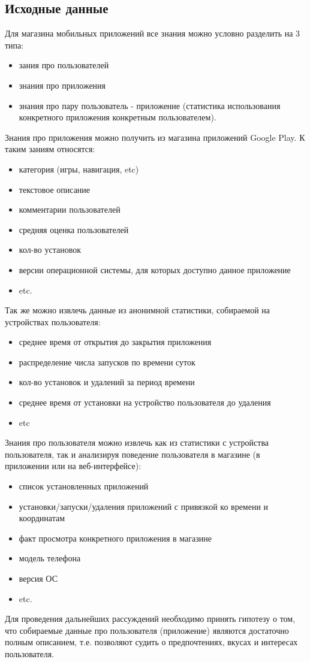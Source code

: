 \documentclass[12pt,a4paper]{report}
\begin{document}
\subsection{Исходные данные}
Для магазина мобильных приложений все знания можно условно разделить на 3 типа:
\begin{itemize}
\item зания про пользователей
\item знания про приложения
\item знания про пару пользователь - приложение (статистика использования конкретного приложения конкретным пользователем).
\end{itemize}
Знания про приложения можно получить из магазина приложений Google Play. К таким заниям относятся:
\begin{itemize}
\item категория (игры, навигация, etc)
\item текстовое описание
\item комментарии пользователей
\item средняя оценка пользователей
\item кол-во установок
\item версии операционной системы, для которых доступно данное приложение
\item etc.
\end{itemize}
Так же можно извлечь данные из анонимной статистики, собираемой на устройствах пользователя:
\begin{itemize}
\item среднее время от открытия до закрытия приложения
\item распределение числа запусков по времени суток
\item кол-во установок и удалений за период времени
\item среднее время от установки на устройство пользователя до удаления
\item etc
\end{itemize}
Знания про пользователя можно извлечь как из статистики с устройства пользователя, так и анализируя поведение пользователя в магазине (в приложении или на веб-интерфейсе):
\begin{itemize}
\item список установленных приложений
\item установки/запуски/удаления приложений с привязкой ко времени и координатам
\item факт просмотра конкретного приложения в магазине
\item модель телефона
\item версия ОС
\item etc.
\end{itemize}
Для проведения дальнейших рассуждений необходимо принять гипотезу о том, что собираемые данные про пользователя (приложение) являются достаточно полным описанием, т.е. позволяют судить о предпочтениях, вкусах и интересах пользователя.
\end{document}
